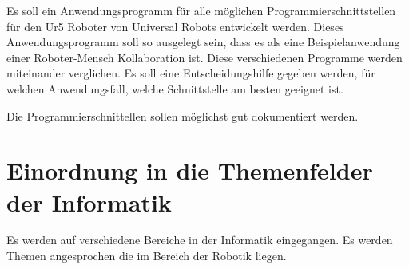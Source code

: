 Es soll ein Anwendungsprogramm für alle möglichen Programmierschnittstellen für den Ur5 Roboter von Universal Robots entwickelt werden.
Dieses Anwendungsprogramm soll so ausgelegt sein, dass es als eine Beispielanwendung einer Roboter-Mensch Kollaboration ist.
Diese verschiedenen Programme werden miteinander verglichen. Es soll eine Entscheidungshilfe gegeben werden, für welchen Anwendungsfall, welche Schnittstelle am besten geeignet ist.

Die Programmierschnittellen sollen möglichst gut dokumentiert werden.

\section{Einordnung in die Themenfelder der Informatik}
\label{sec:einordnung}

Es werden auf verschiedene Bereiche in der Informatik eingegangen. 
Es werden Themen angesprochen die im Bereich der Robotik liegen. 

